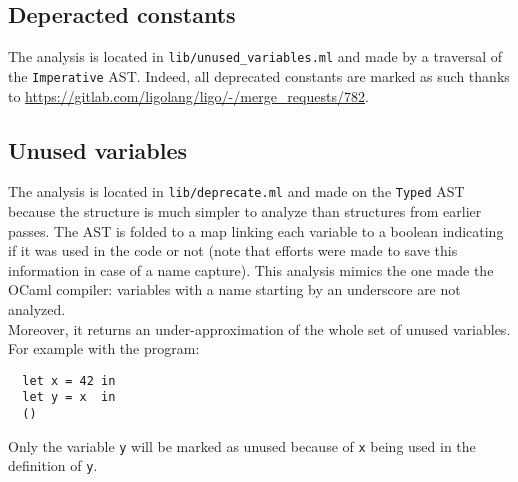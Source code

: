 \documentclass[10pt,a4paper]{article}
\begin{document}
\subsection{Deperacted constants}

The analysis is located in \verb|lib/unused_variables.ml| and made by a traversal of the \verb|Imperative| AST. Indeed, all deprecated constants are marked as such thanks to \url{https://gitlab.com/ligolang/ligo/-/merge_requests/782}.

\subsection{Unused variables}

The analysis is located in \verb|lib/deprecate.ml| and made on the \verb|Typed| AST because the structure is much simpler to analyze than structures from earlier passes. The AST is folded to a map linking each variable to a boolean indicating if it was used in the code or not (note that efforts were made to save this information in case of a name capture).
This analysis mimics the one made the OCaml compiler: variables with a name starting by an underscore are not analyzed.\\
Moreover, it returns an under-approximation of the whole set of unused variables.
For example with the program:
\begin{verbatim}
  let x = 42 in
  let y = x  in
  ()
\end{verbatim}
Only the variable \verb|y| will be marked as unused because of \verb|x| being used in the definition of \verb|y|.


{}
\end{document}
